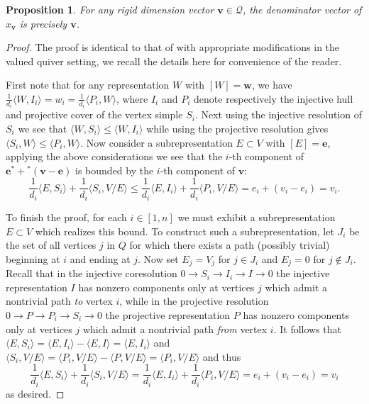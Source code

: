 \documentclass[12pt]{amsart}
\newtheorem{proposition}[theorem]{Proposition}
\newcommand{\bfe}{\mathbf{e}}
\newcommand{\bfv}{\mathbf{v}}
\newcommand{\bfw}{\mathbf{w}}
\newcommand{\cQ}{\mathcal{Q}}
\begin{document}
  \begin{proposition}
    \label{prop:denominators}
    For any rigid dimension vector $\bfv\in\cQ$, the denominator vector of $x_\bfv$ is precisely  $\bfv$.
  \end{proposition}
  \begin{proof}
    The proof is identical to that of \cite[Sec. 4, Cor. 2]{caldero-keller} with appropriate modifications in the valued quiver setting, we recall the details here for convenience of the reader.  

    First note that for any representation $W$ with $[W]=\bfw$, we have $\frac{1}{d_i}\langle W,I_i\rangle=w_i=\frac{1}{d_i}\langle P_i,W\rangle$, where $I_i$ and $P_i$ denote respectively the injective hull and projective cover of the vertex simple $S_i$.
    Next using the injective resolution of $S_i$ we see that $\langle W,S_i\rangle\le\langle W,I_i\rangle$ while using the projective resolution gives $\langle S_i,W\rangle\le\langle P_i,W\rangle$.  Now consider a subrepresentation $E\subset V$ with $[E]=\bfe$, applying the above considerations we see that the $i$-th component of $\bfe^*+{}^*(\bfv-\bfe)$ is bounded by the $i$-th component of $\bfv$:
    \[\frac{1}{d_i}\langle E,S_i\rangle+\frac{1}{d_i}\langle S_i,V/E\rangle\le\frac{1}{d_i}\langle E,I_i\rangle+\frac{1}{d_i}\langle P_i,V/E\rangle=e_i+(v_i-e_i)=v_i.\]

    To finish the proof, for each $i\in[1, n]$ we must exhibit a subrepresentation $E\subset V$ which realizes this bound.  
    To construct such a subrepresentation, let $J_i$ be the set of all vertices $j$ in $Q$ for which there exists a path (possibly trivial) beginning at $i$ and ending at $j$.  
    Now set $E_j=V_j$ for $j\in J_i$ and $E_j=0$ for $j\notin J_i$.  
    Recall that in the injective coresolution $0\longrightarrow S_i\longrightarrow I_i\longrightarrow I\longrightarrow 0$ the injective representation $I$ has nonzero components only at vertices $j$ which admit a nontrivial path \emph{to} vertex $i$, while in the projective resolution $0\longrightarrow P\longrightarrow P_i\longrightarrow S_i\longrightarrow 0$ the projective representation $P$ has nonzero components only at vertices $j$ which admit a nontrivial path \emph{from} vertex $i$.  
    It follows that $\langle E,S_i\rangle=\langle E,I_i\rangle-\langle E,I\rangle=\langle E,I_i\rangle$ and $\langle S_i,V/E\rangle=\langle P_i,V/E\rangle-\langle P,V/E\rangle=\langle P_i,V/E\rangle$ and thus 
    \[\frac{1}{d_i}\langle E,S_i\rangle+\frac{1}{d_i}\langle S_i,V/E\rangle=\frac{1}{d_i}\langle E,I_i\rangle+\frac{1}{d_i}\langle P_i,V/E\rangle=e_i+(v_i-e_i)=v_i\]
    as desired.
  \end{proof}
\end{document}
